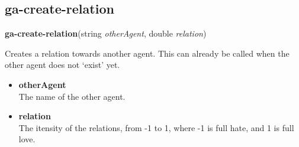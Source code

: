 \subsection{ga-create-relation}

\textbf{ga-create-relation}(string \emph{otherAgent}, double \emph{relation})

Creates a relation towards another agent. This can already be called when the other agent does not `exist' yet.

\begin{itemize}
	\item \textbf{otherAgent} \\ The name of the other agent.
	\item \textbf{relation} \\ The itensity of the relations, from -1 to 1, where -1 is full hate, and 1 is full love.
\end{itemize}




